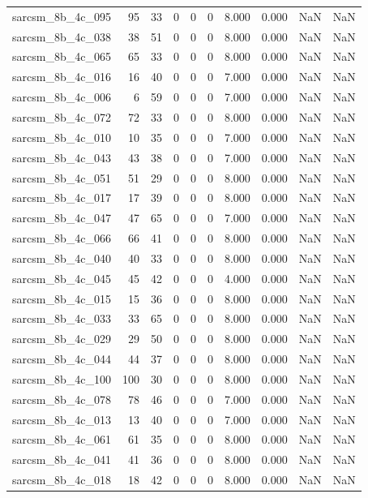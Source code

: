 \documentclass{article}
\begin{document}
\begin{longtable}{lrrrrrrrrr}
sarcsm\_8b\_4c\_095 & 95 & 33 & 0 & 0 & 0 & 8.000 & 0.000 & NaN & NaN \\
sarcsm\_8b\_4c\_038 & 38 & 51 & 0 & 0 & 0 & 8.000 & 0.000 & NaN & NaN \\
sarcsm\_8b\_4c\_065 & 65 & 33 & 0 & 0 & 0 & 8.000 & 0.000 & NaN & NaN \\
sarcsm\_8b\_4c\_016 & 16 & 40 & 0 & 0 & 0 & 7.000 & 0.000 & NaN & NaN \\
sarcsm\_8b\_4c\_006 & 6 & 59 & 0 & 0 & 0 & 7.000 & 0.000 & NaN & NaN \\
sarcsm\_8b\_4c\_072 & 72 & 33 & 0 & 0 & 0 & 8.000 & 0.000 & NaN & NaN \\
sarcsm\_8b\_4c\_010 & 10 & 35 & 0 & 0 & 0 & 7.000 & 0.000 & NaN & NaN \\
sarcsm\_8b\_4c\_043 & 43 & 38 & 0 & 0 & 0 & 7.000 & 0.000 & NaN & NaN \\
sarcsm\_8b\_4c\_051 & 51 & 29 & 0 & 0 & 0 & 8.000 & 0.000 & NaN & NaN \\
sarcsm\_8b\_4c\_017 & 17 & 39 & 0 & 0 & 0 & 8.000 & 0.000 & NaN & NaN \\
sarcsm\_8b\_4c\_047 & 47 & 65 & 0 & 0 & 0 & 7.000 & 0.000 & NaN & NaN \\
sarcsm\_8b\_4c\_066 & 66 & 41 & 0 & 0 & 0 & 8.000 & 0.000 & NaN & NaN \\
sarcsm\_8b\_4c\_040 & 40 & 33 & 0 & 0 & 0 & 8.000 & 0.000 & NaN & NaN \\
sarcsm\_8b\_4c\_045 & 45 & 42 & 0 & 0 & 0 & 4.000 & 0.000 & NaN & NaN \\
sarcsm\_8b\_4c\_015 & 15 & 36 & 0 & 0 & 0 & 8.000 & 0.000 & NaN & NaN \\
sarcsm\_8b\_4c\_033 & 33 & 65 & 0 & 0 & 0 & 8.000 & 0.000 & NaN & NaN \\
sarcsm\_8b\_4c\_029 & 29 & 50 & 0 & 0 & 0 & 8.000 & 0.000 & NaN & NaN \\
sarcsm\_8b\_4c\_044 & 44 & 37 & 0 & 0 & 0 & 8.000 & 0.000 & NaN & NaN \\
sarcsm\_8b\_4c\_100 & 100 & 30 & 0 & 0 & 0 & 8.000 & 0.000 & NaN & NaN \\
sarcsm\_8b\_4c\_078 & 78 & 46 & 0 & 0 & 0 & 7.000 & 0.000 & NaN & NaN \\
sarcsm\_8b\_4c\_013 & 13 & 40 & 0 & 0 & 0 & 7.000 & 0.000 & NaN & NaN \\
sarcsm\_8b\_4c\_061 & 61 & 35 & 0 & 0 & 0 & 8.000 & 0.000 & NaN & NaN \\
sarcsm\_8b\_4c\_041 & 41 & 36 & 0 & 0 & 0 & 8.000 & 0.000 & NaN & NaN \\
sarcsm\_8b\_4c\_018 & 18 & 42 & 0 & 0 & 0 & 8.000 & 0.000 & NaN & NaN \\

\end{longtable}
\end{document}

